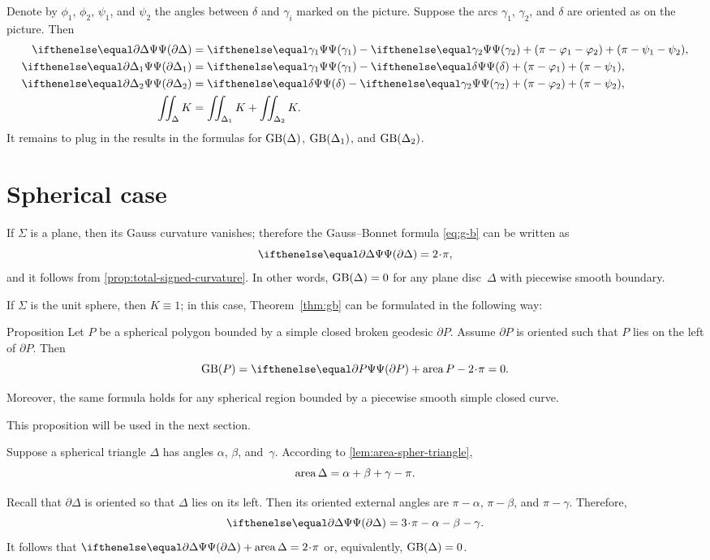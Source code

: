 Denote by $\phi_1$, $\phi_2$, $\psi_1$, and $\psi_2$ the angles between $\delta$ and $\gamma_i$ marked on the picture.
Suppose the arcs $\gamma_1$, $\gamma_2$, and $\delta$ are oriented as on the picture. 
Then
\begin{align*}
\tgc{\partial \Delta}&= \tgc{\gamma_1}-\tgc{\gamma_2}+(\pi-\phi_1-\phi_2)+(\pi-\psi_1-\psi_2),
\\
\tgc{\partial \Delta_1}&= \tgc{\gamma_1}-\tgc\delta+(\pi-\phi_1)+(\pi-\psi_1),
\\
\tgc{\partial \Delta_2}&= \tgc\delta-\tgc{\gamma_2}+(\pi-\phi_2)+(\pi-\psi_2),
\\
\iint_\Delta K&=\iint_{\Delta_1} K+\iint_{\Delta_2} K.
\end{align*}
It remains to plug in the results in the formulas for $\mathop{\rm GB}\nolimits(\Delta)$, $\mathop{\rm GB}\nolimits(\Delta_1)$, and $\mathop{\rm GB}\nolimits(\Delta_2)$.
\qeds

\section{Spherical case}

If $\Sigma$ is a plane, then its Gauss curvature vanishes;
therefore the Gauss--Bonnet formula \ref{eq:g-b} can be written as 
\[\tgc{\partial\Delta}=2\cdot \pi,\]
and it follows from \ref{prop:total-signed-curvature}.
In other words, $\mathop{\rm GB}\nolimits(\Delta)=0$ for any plane disc~$\Delta$ with piecewise smooth boundary.

If $\Sigma$ is the unit sphere, then $K\equiv1$;
in this case, Theorem~\ref{thm:gb} can be formulated in the following way:

\begin{thm}{Proposition}\label{prop:area-of-spher-polygon}
Let $P$ be a spherical polygon bounded by a simple closed broken geodesic $\partial P$.
Assume $\partial P$ is oriented such that $P$ lies on the left of $\partial P$.
Then 
\[\GB(P)=\tgc{\partial P}+\area P-2\cdot \pi=0.\]

Moreover, the same formula holds for any spherical region bounded by a piecewise smooth simple closed curve.
\end{thm}

This proposition will be used in the next section.

Suppose a spherical triangle $\Delta$ has angles 
$\alpha$, $\beta$, and~$\gamma$.
According to \ref{lem:area-spher-triangle},
\[\mathop{\rm area}\nolimits\Delta=\alpha+\beta+\gamma-\pi.\]

Recall that $\partial\Delta$ is oriented so that $\Delta$ lies on its left. 
Then its oriented external angles are  $\pi-\alpha$, $\pi-\beta$, and $\pi-\gamma$.
Therefore,
\[\tgc{\partial\Delta}=3\cdot\pi-\alpha-\beta-\gamma.\]
It follows that $\tgc{\partial\Delta}+\area \Delta=2\cdot\pi$ or, equivalently, $\mathop{\rm GB}\nolimits(\Delta)=0$.
 

